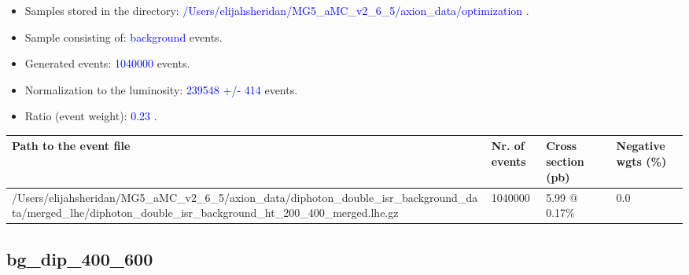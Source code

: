 \documentclass[a4paper, 10pt]{article}
\begin{document}
\begin{itemize}
  \item Samples stored in the directory: \textcolor{blue}{/\-Users/\-elijahsheridan/\-MG5\_aMC\_v2\_6\_5/\-axion\_data/\-optimization} .
   \item Sample consisting of: \textcolor{blue}{background}  events.
   \item Generated events: \textcolor{blue}{1040000 }  events.
   \item Normalization to the luminosity: \textcolor{blue}{239548}\textcolor{blue}{ +/\-- }\textcolor{blue}{414 }  events.
   \item Ratio (event weight): \textcolor{blue}{0.23 } .  
 
\end{itemize}
\begin{table}[H]
  \begin{center}
    \begin{tabular}{|m{55.0mm}|m{25.0mm}|m{30.0mm}|m{30.0mm}|}
      \hline
      {\cellcolor{yellow}         Path to the event file}& {\cellcolor{yellow}         Nr. of events}& {\cellcolor{yellow}         Cross section (pb)}& {\cellcolor{yellow}         Negative wgts (\%)}\\
      \hline
      {\cellcolor{white}          /\-Users/\-elijahsheridan/\-MG5\_aMC\_v2\_6\_5/\-axion\_data/\-diphoton\_double\_isr\_background\_data/\-merged\_lhe/\-diphoton\_double\_isr\_background\_ht\_200\_400\_merged.lhe.gz}& {\cellcolor{white}          1040000}& {\cellcolor{white}          5.99 @ 0.17\%}& {\cellcolor{white}          0.0}\\
\hline
    \end{tabular}
  \end{center}
\end{table}

\subsection{ bg\_dip\_400\_600}
\end{document}
